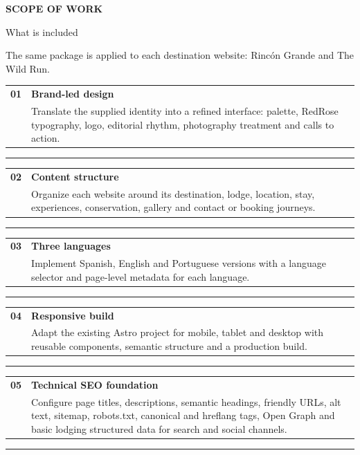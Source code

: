 \documentclass[10pt,oneside]{article}
\makeatletter
\newcommand{\eyebrow}[1]{%
  {\sffamily\fontsize{7}{8}\selectfont\bfseries\color{Forest}\MakeUppercase{#1}}%
}
\newcommand{\scopeitem}[3]{%
  \begin{tabularx}{\textwidth}{@{}p{12mm}X@{}}
    {\displayfont\fontsize{17}{18}\selectfont\color{Sand}\textbf{#1}} &
    {\sffamily\fontsize{10.5}{12}\selectfont\bfseries\color{Forest}#2}\\[-1pt]
    & {\sffamily\fontsize{8.6}{10.5}\selectfont\color{Text}#3}
  \end{tabularx}
  \vspace{2.6mm}\par
  {\color{Line}\rule{\textwidth}{0.35pt}}\par\vspace{2.6mm}
}
\makeatother
\begin{document}
\newpage
\pagestyle{proposal}

\eyebrow{Scope of work}\par\vspace{2mm}
{\displayfont\fontsize{25}{28}\selectfont\color{Forest}What is included\par}
\vspace{2mm}
{\sffamily\fontsize{9}{11}\selectfont\color{Burgundy}
  The same package is applied to each destination website: Rincón Grande and The Wild Run.\par}

\vspace{5mm}
\scopeitem{01}{Brand-led design}{Translate the supplied identity into a refined interface: palette, RedRose typography, logo, editorial rhythm, photography treatment and calls to action.}

\scopeitem{02}{Content structure}{Organize each website around its destination, lodge, location, stay, experiences, conservation, gallery and contact or booking journeys.}

\scopeitem{03}{Three languages}{Implement Spanish, English and Portuguese versions with a language selector and page-level metadata for each language.}

\scopeitem{04}{Responsive build}{Adapt the existing Astro project for mobile, tablet and desktop with reusable components, semantic structure and a production build.}

\scopeitem{05}{Technical SEO foundation}{Configure page titles, descriptions, semantic headings, friendly URLs, alt text, sitemap, robots.txt, canonical and hreflang tags, Open Graph and basic lodging structured data for search and social channels.}
\end{document}

